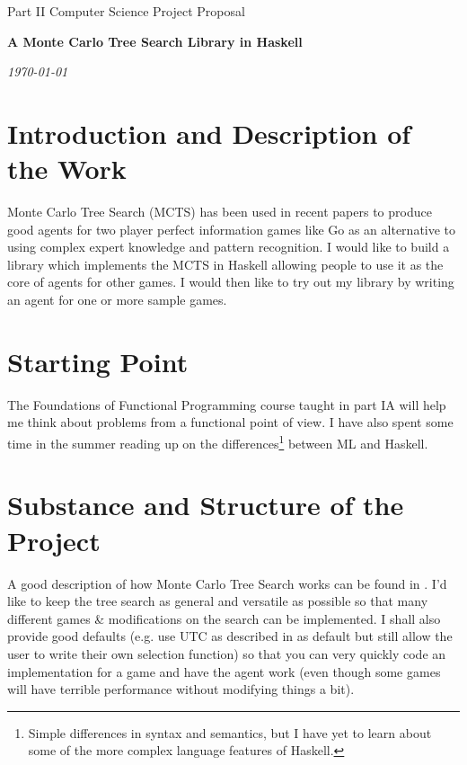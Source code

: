 \documentclass[12pt]{article}
\begin{document}
\thispagestyle{empty}

\medskip
{}
\medskip
{}

\vfil

\centerline{\large Part II Computer Science Project Proposal}
\vspace{0.4in}
\centerline{\Large\bf A Monte Carlo Tree Search Library in Haskell}
\vspace{0.3in}
\centerline{\large \emph{\today}}

\vfil
\eject

\section*{Introduction and Description of the Work}

Monte Carlo Tree Search (MCTS) has been used in recent papers to produce good agents for two player perfect information games like Go as an alternative to using complex expert knowledge and pattern recognition.
I would like to build a library which implements the MCTS in Haskell allowing people to use it as the core of agents for other games.
I would then like to try out my library by writing an agent for one or more sample games.

\section*{Starting Point}

The Foundations of Functional Programming course taught in part IA will help me think about problems from a functional point of view. I have also spent some time in the summer reading up on the differences\footnote{Simple differences in syntax and semantics, but I have yet to learn about some of the more complex language features of Haskell.} between ML and Haskell.\par


\section*{Substance and Structure of the Project}

A good description of how Monte Carlo Tree Search works can be found in \cite{go}. I'd like to keep the tree search as general and versatile as possible so that many different games \& modifications on the search can be implemented. I shall also provide good defaults (e.g. use UTC as described in \cite{go} as default but still allow the user to write their own selection function) so that you can very quickly code an implementation for a game and have the agent work (even though some games will have terrible performance without modifying things a bit).
\end{document}
